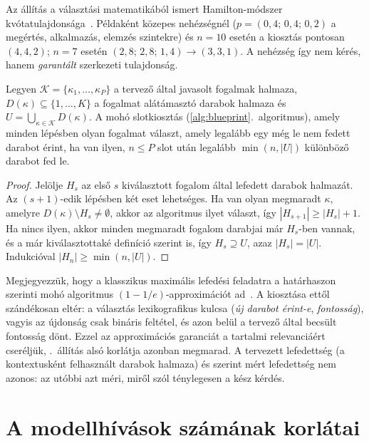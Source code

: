 Az állítás a választási matematikából ismert Hamilton-módszer kvótatulajdonsága~\cite{balinski2001fair}.
Példaként közepes nehézségnél ($p=(0{,}4;\,0{,}4;\,0{,}2)$ a megértés, alkalmazás, elemzés szintekre) és
$n=10$ esetén a kiosztás pontosan $(4,4,2)$; $n=7$ esetén $(2{,}8;\,2{,}8;\,1{,}4)\to(3,3,1)$. A
nehézség így nem kérés, hanem \emph{garantált} szerkezeti tulajdonság.

\begin{allitas}\label{all:lefed}
Legyen $\mathcal{K}=\{\kappa_1,\dots,\kappa_P\}$ a tervező által javasolt fogalmak halmaza, $D(\kappa)\subseteq\{1,\dots,K\}$
a fogalmat alátámasztó darabok halmaza és $U=\bigcup_{\kappa\in\mathcal{K}}D(\kappa)$. A mohó slotkiosztás
(\ref{alg:blueprint}.~algoritmus), amely minden lépésben olyan fogalmat választ, amely legalább egy
még le nem fedett darabot érint, ha van ilyen, $n\le P$ slot után legalább $\min(n,|U|)$ különböző darabot
fed le.
\end{allitas}

\begin{proof}
Jelölje $H_s$ az első $s$ kiválasztott fogalom által lefedett darabok halmazát. Az $(s+1)$-edik lépésben
két eset lehetséges. Ha van olyan megmaradt $\kappa$, amelyre $D(\kappa)\setminus H_s\ne\emptyset$,
akkor az algoritmus ilyet választ, így $|H_{s+1}|\ge|H_s|+1$. Ha nincs ilyen, akkor minden megmaradt fogalom
darabjai már $H_s$-ben vannak, és a már kiválasztottaké definíció szerint is, így $H_s\supseteq U$, azaz
$|H_s|=|U|$. Indukcióval $|H_n|\ge\min(n,|U|)$.
\end{proof}

Megjegyezzük, hogy a klasszikus maximális lefedési feladatra a határhaszon szerinti mohó algoritmus
$(1-1/e)$-approximációt ad~\cite{nemhauser1978}. A \Mimir{} kiosztása ettől szándékosan eltér: a
választás lexikografikus kulcsa (\emph{új darabot érint-e}, \emph{fontosság}), vagyis az újdonság csak
bináris feltétel, és azon belül a tervező által becsült fontosság dönt. Ezzel az approximációs garanciát a
tartalmi relevanciáért cseréljük, \az{\ref{all:lefed}}.~állítás alsó korlátja azonban megmarad. A tervezett
lefedettség (a kontextusként felhasznált darabok halmaza) és \az{\eqref{eq:cov}} szerint mért lefedettség
nem azonos: az utóbbi azt méri, miről szól ténylegesen a kész kérdés.

\section{A modellhívások számának korlátai}
\label{sec:hivasszam}

